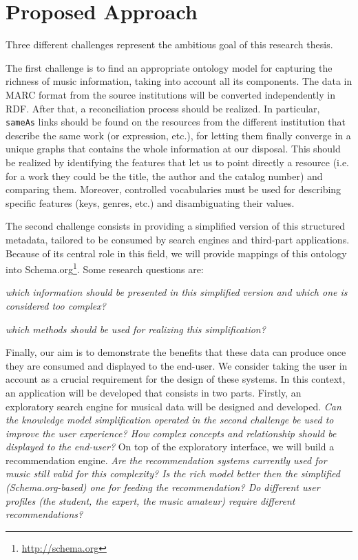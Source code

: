 \documentclass{llncs}
\begin{document}

\section{Proposed Approach}
\label{sec:approach}
Three different challenges represent the ambitious goal of this research thesis.

The first challenge is to find an appropriate ontology model for capturing the richness of music information, taking into account all its components. The data in MARC format from the source institutions will be converted independently in RDF. After that, a reconciliation process should be realized. In particular, \texttt{sameAs} links should be found on the resources from the different institution that describe the same work (or expression, etc.), for letting them finally converge in a unique graphs that contains the whole information at our disposal. This should be realized by identifying the features that let us to point directly a resource (i.e. for a work they could be the title, the author and the catalog number) and comparing them. Moreover, controlled vocabularies must be used for describing specific features (keys, genres, etc.) and disambiguating their values.

The second challenge consists in providing a simplified version of this structured metadata, tailored to be consumed by search engines and third-part applications. Because of its central role in this field, we will provide mappings of this ontology into Schema.org\footnote{\url{http://schema.org}}. Some research questions are:
\begin{enumerate*}
\item{\textit{which information should be presented in this simplified version and which one is considered too complex?}}
\item{\textit{which methods should be used for realizing this simplification?}}
\end{enumerate*}

Finally, our aim is to demonstrate the benefits that these data can produce once they are consumed and displayed to the end-user. We consider taking the user in account as a crucial requirement for the design of these systems. In this context, an application will be developed that consists in two parts. Firstly, an exploratory search engine for musical data will be designed and developed. \textit{Can the knowledge model simplification operated in the second challenge be used to improve the user experience? How complex concepts and relationship should be displayed to the end-user?} On top of the exploratory interface, we will build a recommendation engine. \textit{Are the recommendation systems currently used for music still valid for this complexity? Is the rich model better then the simplified (Schema.org-based) one for feeding the recommendation? Do different user profiles (the student, the expert, the music amateur) require different recommendations?}
\end{document}
